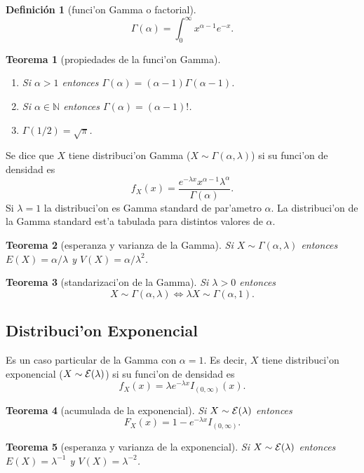 \documentclass[a4paper,spanish]{article}
\newcommand{\N}[0]{\mathbb{N}}
\newcommand{\expon}[0]{{\cal E}}
\newtheorem{teo}{Teorema}
\newtheorem{defi}{Definici\'on}
\begin{document}
\begin{defi}[funci'on Gamma o factorial]
$$\Gamma(\alpha) = \int_0^\infty x^{\alpha-1} e^{-x}.$$
\end{defi}

\begin{teo}[propiedades de la funci'on Gamma]
\begin{enumerate}
\item Si $\alpha > 1$ entonces $\Gamma(\alpha) = (\alpha-1)\Gamma(\alpha-1)$.
\item Si $\alpha \in \N$ entonces $\Gamma(\alpha) = (\alpha-1)!$.
\item $\Gamma(1/2) = \sqrt{\pi}$.
\end{enumerate}
\end{teo}

Se dice que $X$ tiene distribuci'on Gamma ($X \sim \Gamma(\alpha,\lambda)$) si
su funci'on de densidad es
$$f_X(x) = 
	\frac{e^{-\lambda x} x^{\alpha-1} \lambda^\alpha}{\Gamma(\alpha)}.$$
Si $\lambda = 1$ la distribuci'on es Gamma standard de par'ametro $\alpha$.
La distribuci'on de la Gamma standard est'a tabulada para distintos valores de
$\alpha$.

\begin{teo}[esperanza y varianza de la Gamma]
Si $X \sim \Gamma(\alpha,\lambda)$ entonces $E(X) = \alpha/\lambda$ y 
$V(X) = \alpha/\lambda^2$.
\end{teo}

\begin{teo}[standarizaci'on de la Gamma]
Si $\lambda > 0$ entonces
$$X \sim \Gamma(\alpha,\lambda) \Leftrightarrow 
	\lambda X \sim \Gamma(\alpha,1).$$
\end{teo}

\subsection{Distribuci'on Exponencial}

Es un caso particular de la Gamma con $\alpha = 1$. Es decir, $X$ tiene 
distribuci'on exponencial ($X \sim \expon(\lambda)$) si su funci'on de
densidad es
$$f_X(x) = \lambda e^{-\lambda x} I_{(0,\infty)}(x).$$

\begin{teo}[acumulada de la exponencial]
Si $X \sim \expon(\lambda)$ entonces
$$F_X(x) = 1-e^{-\lambda x} I_{(0,\infty)}.$$
\end{teo}

\begin{teo}[esperanza y varianza de la exponencial]
Si $X \sim \expon(\lambda)$ entonces $E(X) = \lambda^{-1}$ y 
$V(X) = \lambda^{-2}$.
\end{teo}
\end{document}
